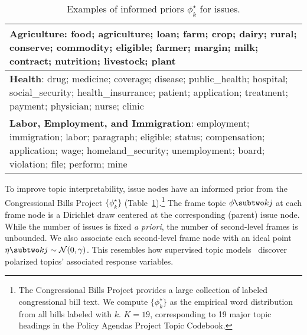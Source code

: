\begin{table}[t!]
\centering \small
\begin{tabular}{p{.95\linewidth}}
  \hline
  \textbf{{Agriculture}}:
    food; agriculture; loan; farm; crop; dairy; rural; conserve; commodity; eligible; farmer; margin; milk; contract; nutrition; livestock; plant \\ \hline

  \textbf{{Health}}:
    drug; medicine; coverage; disease; public\_health; hospital; social\_security; health\_insurrance; patient; application; treatment; payment; physician; nurse; clinic\\ \hline
  \textbf{{Labor, Employment, and Immigration}}:
    employment; immigration; labor; paragraph; eligible; status; compensation; application; wage; homeland\_security; unemployment; board; violation; file; perform; mine \\ \hline

\end{tabular}
\caption{Examples of informed priors $\phi_k^{\star}$ for issues.}
\label{tab:c6_prior}
\end{table}

To improve topic interpretability, issue nodes have an informed prior
from the Congressional Bills Project $\{\phi_k^{\star}\}$
(Table~\ref{tab:c6_prior}).\footnote{The Congressional Bills Project
  provides a large collection of labeled congressional bill text.  We
  compute $\{\phi_k^{\star}\}$ as the empirical word distribution from
  all bills labeled with $k$. $K=19$, corresponding to 19 major topic
  headings in the Policy Agendas Project Topic Codebook. } The frame
topic $\phi \subtwo kj$ at each frame node is a Dirichlet draw
centered at the corresponding (parent) issue node. While the number of
issues is fixed \textit{a priori}, the number of second-level frames
is unbounded.  We also associate each second-level frame node with an
ideal point $\eta \subtwo kj \sim \mathcal{N}(0, \gamma)$. This
resembles how supervised topic
models~\cite{Blei:NIPS07:slda,Nguyen:NAACL15:anchor}
discover polarized topics' associated response variables.

